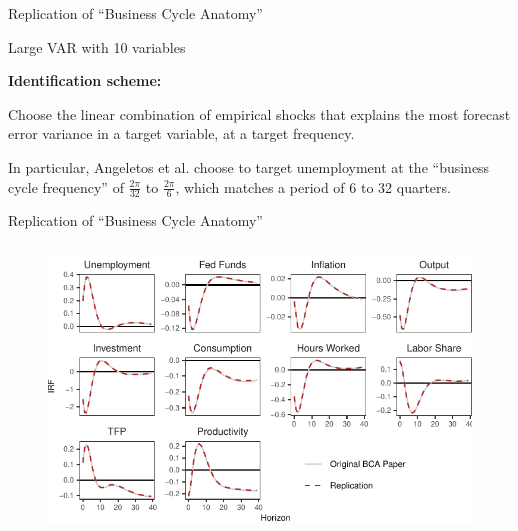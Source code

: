 \begin{frame}{Replication of ``Business Cycle Anatomy''}
    
    \label{replication-slide}

    Large VAR with 10 variables

    \vspace{0.5cm}

    \textbf{Identification scheme:}

    Choose the linear combination of empirical shocks that explains the most forecast error variance in a target variable, at a target frequency.

    \vspace{0.5cm}

    In particular, Angeletos et al. choose to target unemployment at the ``business cycle frequency'' of $\frac{2 \pi}{32}$ to $\frac{2 \pi}{6}$, which matches a period of 6 to 32 quarters. 

\end{frame}


\begin{frame}{Replication of ``Business Cycle Anatomy''}

    \begin{figure}
        \includegraphics[height = 3in]{figs/fig1_bca_replication.pdf}
    \end{figure}

\end{frame}
